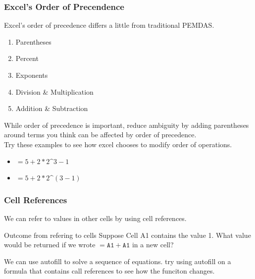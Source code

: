 \documentclass[12pt]{beamer}
\begin{document}
	\begin{frame}
		\frametitle{Excel's Order of Precendence}
		Excel's order of precedence differs a little from traditional PEMDAS. 
		\begin{enumerate}
			\item Parentheses
			\item Percent
			\item Exponents
			\item Division \& Multiplication
			\item Addition \& Subtraction
		\end{enumerate}
		While order of precedence is important, reduce ambiguity by adding parentheses around terms you think can be affected by order of precedence.\\
		\bigskip
		Try these examples to see how excel chooses to modify order of operations.
		\begin{itemize}
			\item $= 5+2 * 2 \sphat 3 - 1$
			\item $= 5+2 * 2 \sphat (3-1)$
		\end{itemize}
	\end{frame}
	\begin{frame}
		\frametitle{Cell References}
		We can refer to values in other cells by using cell references. \bigskip 
		\begin{exampleblock}{Outcome from refering to cells}
		Suppose Cell A1 contains the value 1. What value would be returned if we wrote $ = \texttt{A1} + \texttt{A1}$ in a new cell?
		\end{exampleblock}
		\bigskip
		We can use autofill to solve a sequence of equations. try using autofill on a formula that contains call references to see how the funciton changes.
\end{frame}
\end{document}
